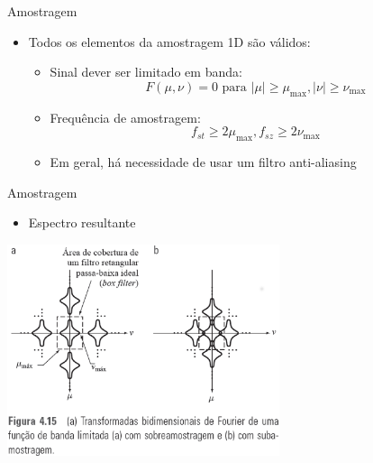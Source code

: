       \begin{slide}[toc=]{Amostragem}
         \begin{itemize}[type=1]
            \item Todos os elementos da amostragem 1D são válidos:
            \begin{itemize}
               \item Sinal dever ser limitado em banda:
               \begin{equation*}
                  F(\mu,\nu) = 0 \text{ para } |\mu|\geq \mu_\text{max}, |\nu|\geq \nu_\text{max} 
               \end{equation*}
               \item Frequência de amostragem:
               \begin{equation*}
                  f_{st} \geq 2 \mu_\text{max}, f_{sz} \geq 2 \nu_\text{max}
               \end{equation*}
               \item Em geral, há necessidade de usar um filtro anti-aliasing
            \end{itemize}
         \end{itemize}
      \end{slide}
      
      \begin{slide}[toc=]{Amostragem}
         \begin{itemize}[type=1]
            \item Espectro resultante
         \end{itemize}
	      \begin{center}
		      \includegraphics[width=0.60\textwidth]{figs/fig0415}
	      \end{center}
      \end{slide}

